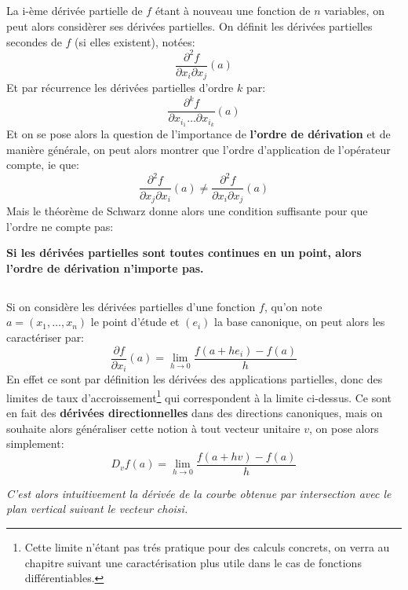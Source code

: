 \subsection*{}
La i-ème dérivée partielle de \(f\) étant à nouveau une fonction de \(n\) variables, on peut alors considèrer ses dérivées partielles. On définit les dérivées partielles secondes de \(f\) (si elles existent), notées:
\[
   \frac{\partial^2 f}{\partial x_i \partial x_j}(a)   
\]
Et par récurrence les dérivées partielles d'ordre \(k\) par:
\[
   \frac{\partial^k f}{\partial x_{i_1} \ldots \partial x_{i_k}}(a)
\]
Et on se pose alors la question de l'importance de \textbf{l'ordre de dérivation} et de manière générale, on peut alors montrer que l'ordre d'application de l'opérateur compte, ie que:
\[
   \frac{\partial^2 f}{\partial x_j \partial x_i}(a) \neq \frac{\partial^2 f}{\partial x_i \partial x_j}(a)
\]
Mais le théorème de Schwarz donne alors une condition suffisante pour que l'ordre ne compte pas:
\begin{center}
   \textbf{Si les dérivées partielles sont toutes continues en un point, alors l'ordre de dérivation n'importe pas.}
\end{center}
\subsection*{}
Si on considère les dérivées partielles d'une fonction \(f\), qu'on note \(a = (x_1, \ldots, x_n)\) le point d'étude et \((e_i)\) la base canonique, on peut alors les caractériser par:
\[
   \frac{\partial f}{\partial x_i}(a) = \lim_{h \rightarrow 0} \frac{f(a + he_i) - f(a)}{h}
\] 
En effet ce sont par définition les dérivées des applications partielles, donc des limites de taux d'accroissement\footnote[1]{Cette limite n'étant pas trés pratique pour des calculs concrets, on verra au chapitre suivant une caractérisation plus utile dans le cas de fonctions différentiables.} qui correspondent à la limite ci-dessus.\+
Ce sont en fait des \textbf{dérivées directionnelles} dans des directions canoniques, mais on souhaite alors généraliser cette notion à tout vecteur unitaire \(v\), on pose alors simplement:
\[
   D_vf(a) = \lim_{h \rightarrow 0} \frac{f(a + hv) - f(a)}{h}
\]
\begin{center}
   \textit{C'est alors intuitivement la dérivée de la courbe obtenue par intersection avec le plan vertical suivant le vecteur choisi.}
\end{center}

